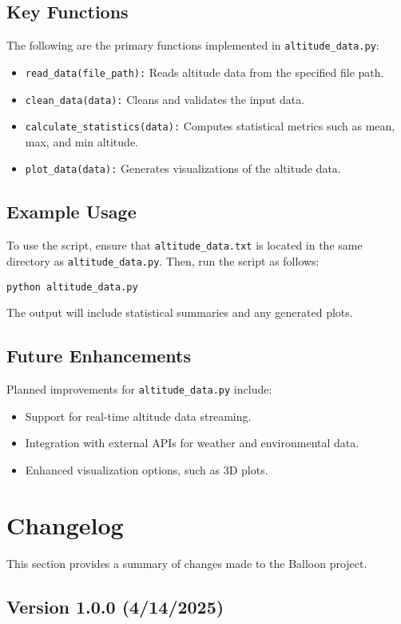 \documentclass{article}
\begin{document}
\subsection{Key Functions}
The following are the primary functions implemented in \texttt{altitude\_data.py}:
\begin{itemize}
    \item \texttt{read\_data(file\_path):} Reads altitude data from the specified file path.
    \item \texttt{clean\_data(data):} Cleans and validates the input data.
    \item \texttt{calculate\_statistics(data):} Computes statistical metrics such as mean, max, and min altitude.
    \item \texttt{plot\_data(data):} Generates visualizations of the altitude data.
\end{itemize}

\subsection{Example Usage}
To use the script, ensure that \texttt{altitude\_data.txt} is located in the same directory as \texttt{altitude\_data.py}. Then, run the script as follows:
\begin{verbatim}
python altitude_data.py
\end{verbatim}
The output will include statistical summaries and any generated plots.

\subsection{Future Enhancements}
Planned improvements for \texttt{altitude\_data.py} include:
\begin{itemize}
    \item Support for real-time altitude data streaming.
    \item Integration with external APIs for weather and environmental data.
    \item Enhanced visualization options, such as 3D plots.
\end{itemize}

\section{Changelog}
This section provides a summary of changes made to the Balloon project.

\subsection{Version 1.0.0 (4/14/2025)}
\end{document}

